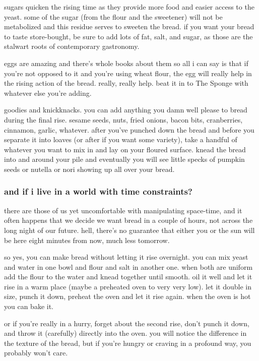 sugars quicken the rising time as they provide more food and easier
access to the yeast. some of the sugar (from the flour and the
sweetener) will not be metabolized and this residue serves to sweeten
the bread. if you want your bread to taste store-bought, be sure to
add lots of fat, salt, and sugar, as those are the stalwart roots of
contemporary gastronomy.

eggs are amazing and there's whole books about them so all i can
say is that if you're not opposed to it and you're using wheat
flour, the egg will really help in the rising action of the
bread. really, really help. beat it in to The Sponge with whatever
else you're adding.

goodies and knickknacks. you can add anything you damn well please to
bread during the final rise. sesame seeds, nuts, fried onions, bacon
bits, cranberries, cinnamon, garlic, whatever. after you've punched
down the bread and before you separate it into loaves (or after if you
want some variety), take a handful of whatever you want to mix in and
lay on your floured surface. knead the bread into and around your pile
and eventually you will see little specks of pumpkin seeds or nutella
or nori showing up all over your bread.

\subsubsection{and if i live in a world with time constraints?}

there are those of us yet uncomfortable with manipulating space-time,
and it often happens that we decide we want bread in a couple of
hours, not across the long night of our future. hell, there's no
guarantee that either you or the sun will be here eight minutes from
now, much less tomorrow.

so yes, you can make bread without letting it rise overnight. you can
mix yeast and water in one bowl and flour and salt in another
one. when both are uniform add the flour to the water and knead
together until smooth. oil it well and let it rise in a warm place
(maybe a preheated oven to very very low). let it double in size,
punch it down, preheat the oven and let it rise again. when the oven
is hot you can bake it.

or if you're really in a hurry, forget about the second rise,
don't punch it down, and throw it (carefully) directly into the
oven. you will notice the difference in the texture of the bread, but
if you're hungry or craving in a profound way, you probably
won't care.

